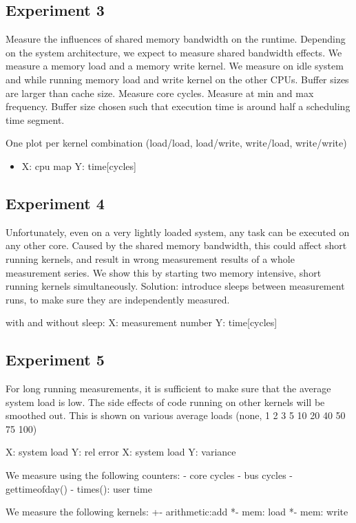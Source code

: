 \documentclass[a4paper,12pt]{article}
\begin{document}
\subsection{Experiment 3}
Measure the influences of shared memory bandwidth on the runtime. Depending on
the system architecture, we expect to measure shared bandwidth effects. We
measure a memory load and a memory write kernel. We measure on idle system and
while running memory load and write kernel on the other CPUs. Buffer sizes are
larger than cache size. Measure core cycles. Measure at min and max frequency.
Buffer size chosen such that execution time is around half a scheduling time
segment.

One plot per kernel combination (load/load, load/write, write/load, write/write)
\begin{itemize}
\item X: cpu map Y: time[cycles]
\end{itemize}


\subsection{Experiment 4}
Unfortunately, even on a very lightly loaded system, any task can be executed on
any other core. Caused by the shared memory bandwidth, this could affect short
running kernels, and result in wrong measurement results of a whole measurement
series. We show this by starting two memory intensive, short running kernels
simultaneously. Solution: introduce sleeps between measurement runs, to make
sure they are independently measured.

with and without sleep: X: measurement number Y: time[cycles]

\subsection{Experiment 5}
For long running measurements, it is sufficient to make sure that the average
system load is low. The side effects of code running on other kernels will be
smoothed out. This is shown on various average loads (none, 1 2 3 5 10 20 40 50
75 100)

X: system load Y: rel error
X: system load Y: variance

We measure using the following counters:
- core cycles
- bus cycles
- gettimeofday()
- times(): user time

We measure the following kernels:
+- arithmetic:add
*- mem: load
*- mem: write
\end{document}
